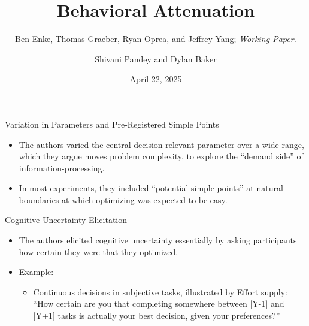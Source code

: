 \documentclass[11pt, aspectratio=169]{beamer}
\begin{document}
\title{Behavioral Attenuation}
\subtitle{\normalsize Ben Enke, Thomas Graeber, Ryan Oprea, and Jeffrey Yang;  \textit{Working Paper.}}
\author{Shivani Pandey and Dylan Baker}
\date{April 22, 2025}

\begin{frame} 
\maketitle
\end{frame}

\begin{frame}{Variation in Parameters and Pre-Registered Simple Points}

\begin{itemize}
    \item The authors 
        varied the central decision-relevant 
        parameter over a wide range, which 
        they argue moves problem complexity,
        to explore the ``demand side'' 
        of information-processing.
    \vfill
    \item In most experiments, they included 
        ``potential simple points'' at natural
        boundaries at which optimizing was 
        expected to be easy.
\end{itemize}
    
\end{frame}


\begin{frame}{Cognitive Uncertainty Elicitation}

    \begin{itemize}
        \item The authors elicited cognitive uncertainty 
            essentially by asking participants
            how certain they were that they 
            optimized.
        \vfill
        \item Example:
            \begin{itemize}
                \item Continuous decisions in subjective tasks, illustrated by Effort supply: 
                ``How certain are you that completing somewhere between [Y-1] and [Y+1] tasks is actually your best decision, given your preferences?''
            \end{itemize}
    \end{itemize}
    
\end{frame}
\end{document}
